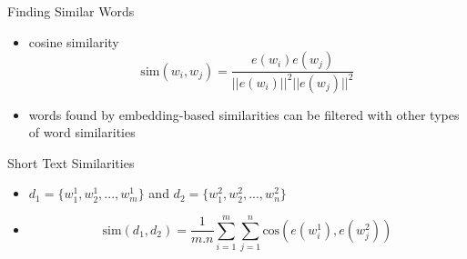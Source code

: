  
 \begin{frame}{Finding Similar Words}
     \begin{itemize}
              \item<4-> cosine similarity
         \begin{equation*}
             \text{sim}(w_i,w_j) = \frac{e(w_i) e(w_j)}{||e(w_i)||^2 ||e(w_j)||^2}
         \end{equation*} 
        \item words found by embedding-based similarities can be filtered with other types of word similarities 
     \end{itemize}
 \end{frame}
\begin{frame}{Short Text Similarities}
     
     \begin{itemize}
        \item<1->  $d_1 = \{ w^1_1, w^1_2, ..., w^1_m \}$ and $d_2 = \{ w^2_1, w^2_2, ..., w^2_n \}$
        \item<2-> 
            \begin{equation*}
                \text{sim}(d_1, d_2) = \frac{1}{m.n}\sum_{i = 1}^m \sum_{j=1}^{n} \text{cos} \left( e(w_i^1), e(w_j^2) \right)
            \end{equation*}
          
     \end{itemize}
 \end{frame} 
